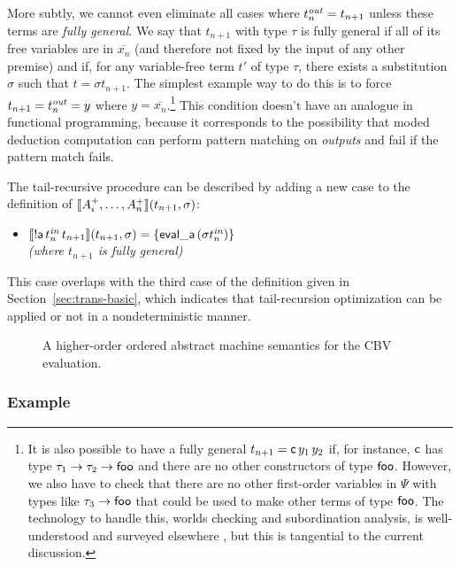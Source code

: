 More subtly, we cannot even eliminate all cases where $t^{\it out}_n =
t_{n+1}$ unless these terms are {\it fully general}. We say that
$t_{n+1}$ with type $\tau$ is fully general if all of its free
variables are in $\overline{x_n}$ (and therefore not fixed by the
input of any other premise) and if, for any variable-free term $t'$ of
type $\tau$, there exists a substitution $\sigma$ such that $t =
{\sigma}t_{n+1}$. The simplest example way to do this is to force
$t_{n+1} = t^{\it out}_n = y$ where $y = \overline{x_n}$.\footnote{It
  is also possible to have a fully general $t_{n+1} = {\sf
    c}\,y_1\,y_2$ if, for instance, ${\sf c}$ has type $\tau_1
  \rightarrow \tau_2 \rightarrow {\sf foo}$ and there are no other
  constructors of type ${\sf foo}$. However, we also have to check
  that there are no other first-order variables in $\Psi$ with types
  like $\tau_3 \rightarrow {\sf foo}$ that could be used to make other
  terms of type ${\sf foo}$. The technology to handle this, worlds
  checking and subordination analysis, is well-understood and surveyed
  elsewhere \cite{harper07mechanizing}, but this is tangential to the
  current discussion.} This condition doesn't have an analogue in
functional programming, because it corresponds to the possibility that
moded deduction computation can perform pattern matching on {\it
  outputs} and fail if the pattern match fails.

The tail-recursive procedure can be described by adding a new 
case to the definition of 
$\llbracket {A^+_i,\ldots,A^+_n} \rrbracket({t_{n+1}},{\sigma})$:

\begin{itemize}
\item $\llbracket {{!}{\sf a}\,t^{\it in}_n\,t_{n+1}} \rrbracket({t_{n+1}},{\sigma}) 
  = \{{\sf eval\_a}\,({\sigma}{t^{\it in}_n})\}$
\\
  {\it (where $t_{n+1}$ is fully general)}
\end{itemize}
This case overlaps with the third case of the definition given
in Section~\ref{sec:trans-basic}, which indicates that tail-recursion
optimization can be applied or not in a nondeterministic manner.

\begin{figure}
\caption{A higher-order ordered abstract machine semantics for the CBV
  evaluation.}
\label{fig:cbv-ev-ssos-tail}
\end{figure}

\subsubsection{Example}

